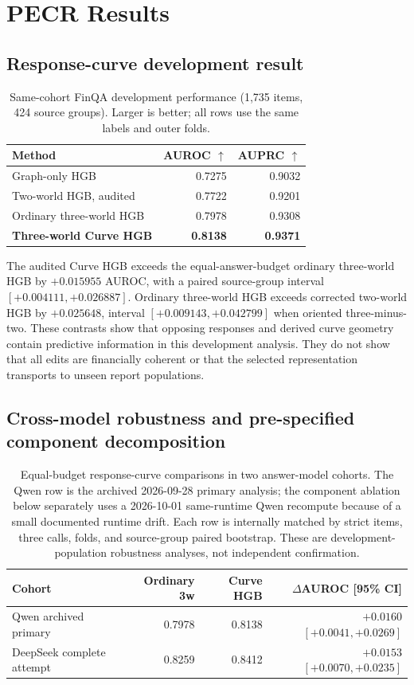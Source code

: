 \documentclass[11pt]{article}
\begin{document}
\section{PECR Results}
\subsection{Response-curve development result}
\begin{table}[t]
\centering
\small
\caption{Same-cohort FinQA development performance (1,735 items, 424 source groups). Larger is better; all rows use the same labels and outer folds.}
\label{tab:main}
\begin{tabular}{lrr}
\toprule
Method & AUROC $\uparrow$ & AUPRC $\uparrow$ \\
\midrule
Graph-only HGB & 0.7275 & 0.9032 \\
Two-world HGB, audited & 0.7722 & 0.9201 \\
Ordinary three-world HGB & 0.7978 & 0.9308 \\
\textbf{Three-world Curve HGB} & \textbf{0.8138} & \textbf{0.9371} \\
\bottomrule
\end{tabular}
\end{table}

The audited Curve HGB exceeds the equal-answer-budget ordinary three-world HGB by $+0.015955$ AUROC, with a paired source-group interval $[+0.004111,+0.026887]$. Ordinary three-world HGB exceeds corrected two-world HGB by $+0.025648$, interval $[+0.009143,+0.042799]$ when oriented three-minus-two. These contrasts show that opposing responses and derived curve geometry contain predictive information in this development analysis. They do not show that all edits are financially coherent or that the selected representation transports to unseen report populations.

\subsection{Cross-model robustness and pre-specified component decomposition}
\begin{table}[t]
\centering
\small
\caption{Equal-budget response-curve comparisons in two answer-model cohorts. The Qwen row is the archived 2026-09-28 primary analysis; the component ablation below separately uses a 2026-10-01 same-runtime Qwen recompute because of a small documented runtime drift. Each row is internally matched by strict items, three calls, folds, and source-group paired bootstrap. These are development-population robustness analyses, not independent confirmation.}
\label{tab:crossmodel}
\begin{tabular}{lrrr}
\toprule
Cohort & Ordinary 3w & Curve HGB & $\Delta$AUROC [95\% CI] \\
\midrule
Qwen archived primary & 0.7978 & 0.8138 & $+0.0160$ $[+0.0041,+0.0269]$ \\
DeepSeek complete attempt & 0.8259 & 0.8412 & $+0.0153$ $[+0.0070,+0.0235]$ \\
\bottomrule
\end{tabular}
\end{table}
\end{document}
